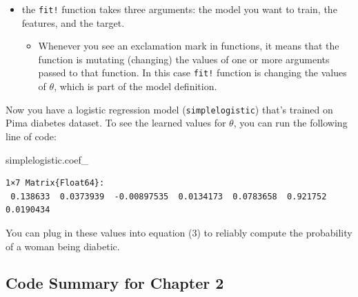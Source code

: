 \documentclass[
  letterpaper,
]{book}
\newenvironment{Shaded}{\begin{snugshade}}{\end{snugshade}}
\newcommand{\NormalTok}[1]{\textcolor[rgb]{0.00,0.23,0.31}{#1}}
\providecommand{\tightlist}{%
  \setlength{\itemsep}{0pt}\setlength{\parskip}{0pt}}\usepackage{longtable,booktabs,array}
\begin{document}
\begin{itemize}
\tightlist
\item
  the \texttt{fit!} function takes three arguments: the model you want
  to train, the features, and the target.

  \begin{itemize}
  \tightlist
  \item
    Whenever you see an exclamation mark in functions, it means that the
    function is mutating (changing) the values of one or more arguments
    passed to that function. In this case \texttt{fit!} function is
    changing the values of \(\theta\), which is part of the model
    definition.
  \end{itemize}
\end{itemize}

Now you have a logistic regression model (\texttt{simplelogistic})
that's trained on Pima diabetes dataset. To see the learned values for
\(\theta\), you can run the following line of code:

\begin{Shaded}
\begin{Highlighting}[]
\NormalTok{simplelogistic.coef\_}
\end{Highlighting}
\end{Shaded}

\begin{verbatim}
1×7 Matrix{Float64}:
 0.138633  0.0373939  -0.00897535  0.0134173  0.0783658  0.921752  0.0190434
\end{verbatim}

You can plug in these values into equation (3) to reliably compute the
probability of a woman being diabetic.

\hypertarget{code-summary-for-chapter-2}{%
\subsection*{Code Summary for Chapter
2}\label{code-summary-for-chapter-2}}
\end{document}
